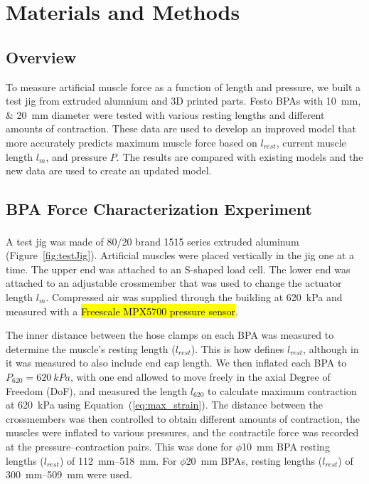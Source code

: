 \documentclass[actuators,article,accept,pdftex,moreauthors]{Definitions/mdpi}
\begin{document}
\section{Materials and Methods}

\subsection{Overview}

To measure artificial muscle force as a function of length and pressure, we built a test jig from extruded alumnium and 3D printed parts. Festo BPAs with \qtylist{10;20}{\mm} diameter were tested with various resting lengths and different amounts of contraction. These data are used to develop an improved model that more accurately predicts maximum muscle force based on $l_{rest}$, current muscle length $l_{m}$, and pressure $P$. The results are compared with existing models and the new data are used to create an updated model. 

\subsection{BPA Force Characterization Experiment}
A test jig was made of 80/20\textsuperscript{{\textregistered}} brand 1515 series extruded aluminum (Figure~\ref{fig:testJig}). Artificial muscles were placed vertically in the jig one at a time. The upper end was attached to an S-shaped load cell. The lower end was attached to an adjustable crossmember that was used to change the actuator length $l_{m}$. Compressed air was supplied through the building at \qty{620}{\kPa} and measured with a \hl{Freescale MPX5700 pressure sensor}. 

The inner distance between the hose clamps on each BPA was measured to determine the muscle's resting length ($l_{rest}$). This is how \citet{festo_2026} defines $l_{rest}$, although in \citet{hunt_modeling_2017} it was measured to also include end cap length. We then inflated each BPA to $P_{620}=\qty{620}{kPa}$, with one end allowed to move freely in the axial Degree of Freedom (DoF), and measured the length $l_{620}$ to calculate maximum contraction at \qty{620}{\kPa} using Equation~(\ref{eq:max_strain}). The distance between the crossmembers was then controlled to obtain different amounts of contraction, the muscles were inflated to various pressures, and the contractile force was recorded at the pressure--contraction pairs. This was done for $\phi$\qty{10}{\mm} BPA resting lengths ($l_{rest}$) of \SIrange[range-phrase=--]{112}{518}{\mm}. For $\phi$\qty{20}{\mm} BPAs, resting lengths ($l_{rest}$) of \SIrange[range-phrase=--]{300}{509}{\mm} were used.
\end{document}
